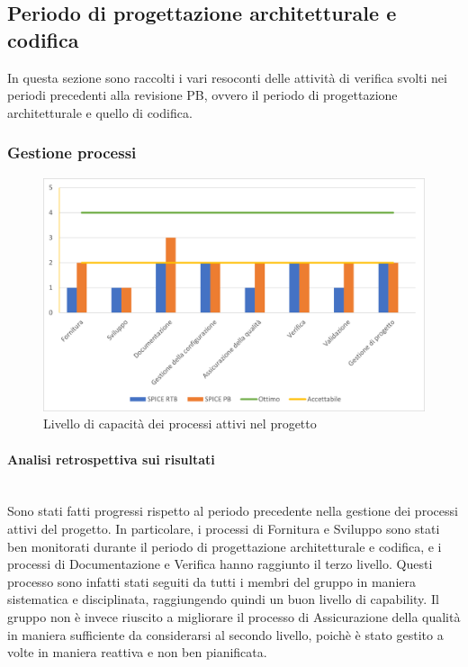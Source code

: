 \subsection{Periodo di progettazione architetturale e codifica}
In questa sezione sono raccolti i vari resoconti delle attività di verifica svolti nei periodi precedenti alla revisione PB, ovvero il periodo di progettazione architetturale e quello di codifica.
\subsubsection{Gestione processi}
\begin{figure}[H]
	\centering
	\includegraphics[scale=0.9]{img/SPICE2.png}
	\caption{Livello di capacità dei processi attivi nel progetto}
\end{figure}
\paragraph{Analisi retrospettiva sui risultati}\mbox{}\\
Sono stati fatti progressi rispetto al periodo precedente nella gestione dei processi attivi del progetto. In particolare, i processi di Fornitura e Sviluppo sono stati ben monitorati durante il periodo di progettazione architetturale e codifica, e i processi di Documentazione e Verifica hanno raggiunto il terzo livello. Questi processo sono infatti stati seguiti da tutti i membri del gruppo in maniera sistematica e disciplinata, raggiungendo quindi un buon livello di capability.
Il gruppo non è invece riuscito a migliorare il processo di Assicurazione della qualità in maniera sufficiente da considerarsi al secondo livello, poichè è stato gestito a volte in maniera reattiva e non ben pianificata.

